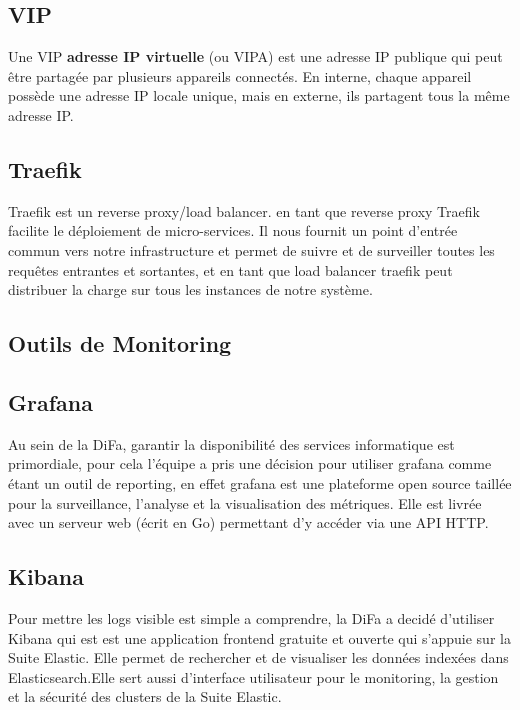 \subsection*{VIP}
Une VIP \textbf{adresse IP virtuelle} (ou VIPA) est une adresse IP publique qui
peut être partagée par plusieurs appareils connectés. En interne, chaque appareil
possède une adresse IP locale unique, mais en externe, ils partagent tous la même
adresse IP.

\subsection*{Traefik}
Traefik est un reverse proxy/load balancer. en tant que reverse proxy Traefik facilite le déploiement de micro-services. Il nous fournit un point d’entrée commun
vers notre infrastructure et permet de suivre et de surveiller toutes les requêtes entrantes et sortantes, et en tant que load balancer traefik peut distribuer la charge
sur tous les instances de notre système.

\subsection{Outils de Monitoring}
\subsection*{Grafana}
Au sein de la DiFa, garantir la disponibilité des services informatique est primordiale, pour cela l’équipe a pris une décision pour utiliser grafana comme étant un
outil de reporting, en effet grafana est une plateforme open source taillée pour
la surveillance, l’analyse et la visualisation des métriques. Elle est livrée avec un
serveur web (écrit en Go) permettant d’y accéder via une API HTTP.

\subsection*{Kibana}
Pour mettre les logs visible est simple a comprendre, la DiFa a decidé d’utiliser
Kibana qui est est une application frontend gratuite et ouverte qui s’appuie sur la
Suite Elastic. Elle permet de rechercher et de visualiser les données indexées dans
Elasticsearch.Elle sert aussi d’interface utilisateur pour le monitoring, la gestion
et la sécurité des clusters de la Suite Elastic.

